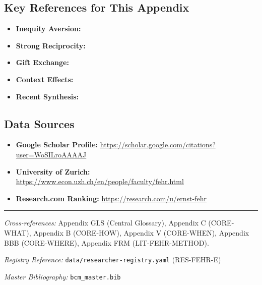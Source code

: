 \subsection{Key References for This Appendix}

\begin{itemize}[nosep]
    \item \textbf{Inequity Aversion:} \citet{fehr1999theory}
    \item \textbf{Strong Reciprocity:} \citet{fehr2002strong, PAP-gaechter2002altruistic}
    \item \textbf{Gift Exchange:} \citet{fehr1993reciprocity, fehr1998reciprocity}
    \item \textbf{Context Effects:} \citet{cohn2014business, cohn2015evidence}
    \item \textbf{Recent Synthesis:} \citet{fehr2025social}
\end{itemize}

\subsection{Data Sources}

\begin{itemize}[nosep]
    \item \textbf{Google Scholar Profile:} \url{https://scholar.google.com/citations?user=WoSILroAAAAJ}
    \item \textbf{University of Zurich:} \url{https://www.econ.uzh.ch/en/people/faculty/fehr.html}
    \item \textbf{Research.com Ranking:} \url{https://research.com/u/ernst-fehr}
\end{itemize}



\vspace{1em}
\hrule
\vspace{0.5em}

\noindent\textit{Cross-references:}
Appendix GLS (Central Glossary),
Appendix C (CORE-WHAT),
Appendix B (CORE-HOW),
Appendix V (CORE-WHEN),
Appendix BBB (CORE-WHERE),
Appendix FRM (LIT-FEHR-METHOD).

\noindent\textit{Registry Reference:} \texttt{data/researcher-registry.yaml} (RES-FEHR-E)

\noindent\textit{Master Bibliography:} \texttt{bcm\_master.bib}

